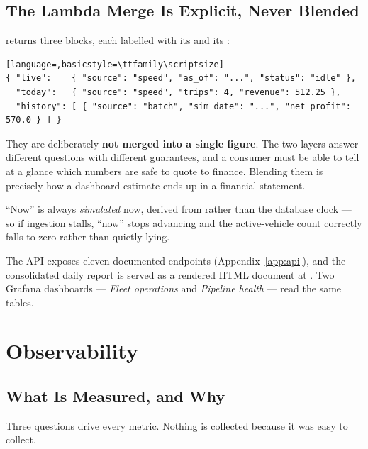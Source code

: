\subsection{The Lambda Merge Is Explicit, Never Blended}
\label{sec:impl-merge}

 returns three blocks, each labelled with its
 and its :

\begin{lstlisting}[language=,basicstyle=\ttfamily\scriptsize]
{ "live":    { "source": "speed", "as_of": "...", "status": "idle" },
  "today":   { "source": "speed", "trips": 4, "revenue": 512.25 },
  "history": [ { "source": "batch", "sim_date": "...", "net_profit": 570.0 } ] }
\end{lstlisting}

They are deliberately \textbf{not merged into a single figure}. The two
layers answer different questions with different guarantees, and a
consumer must be able to tell at a glance which numbers are safe to quote
to finance. Blending them is precisely how a dashboard estimate ends up
in a financial statement.

``Now'' is always \emph{simulated} now, derived from
 rather than the database clock --- so if
ingestion stalls, ``now'' stops advancing and the active-vehicle count
correctly falls to zero rather than quietly lying.

The API exposes eleven documented endpoints
(Appendix~\ref{app:api}), and the consolidated daily report is served as
a rendered HTML document at . Two
Grafana dashboards --- \emph{Fleet operations} and \emph{Pipeline health}
--- read the same tables.

\section{Observability}
\label{sec:impl-observability}

\subsection{What Is Measured, and Why}

Three questions drive every metric. Nothing is collected because it was
easy to collect.


